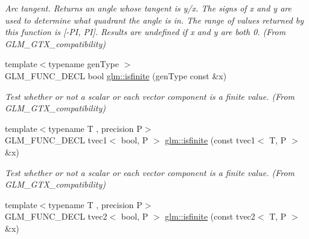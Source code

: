 \begin{DoxyCompactItemize}
\begin{DoxyCompactList}\small\item\em Arc tangent. Returns an angle whose tangent is y/x. The signs of x and y are used to determine what quadrant the angle is in. The range of values returned by this function is \mbox{[}-\/\-P\-I, P\-I\mbox{]}. Results are undefined if x and y are both 0. (From G\-L\-M\-\_\-\-G\-T\-X\-\_\-compatibility) \end{DoxyCompactList}\item 
\hypertarget{group__gtx__compatibility_gaf4b04dcd3526996d68c1bfe17bfc8657}{{\footnotesize template$<$typename gen\-Type $>$ }\\G\-L\-M\-\_\-\-F\-U\-N\-C\-\_\-\-D\-E\-C\-L bool \hyperlink{group__gtx__compatibility_gaf4b04dcd3526996d68c1bfe17bfc8657}{glm\-::isfinite} (gen\-Type const \&x)}\label{group__gtx__compatibility_gaf4b04dcd3526996d68c1bfe17bfc8657}

\begin{DoxyCompactList}\small\item\em Test whether or not a scalar or each vector component is a finite value. (From G\-L\-M\-\_\-\-G\-T\-X\-\_\-compatibility) \end{DoxyCompactList}\item 
\hypertarget{group__gtx__compatibility_ga553e2e95b06a0f70c718605998889d3b}{{\footnotesize template$<$typename T , precision P$>$ }\\G\-L\-M\-\_\-\-F\-U\-N\-C\-\_\-\-D\-E\-C\-L tvec1$<$ bool, P $>$ \hyperlink{group__gtx__compatibility_ga553e2e95b06a0f70c718605998889d3b}{glm\-::isfinite} (const tvec1$<$ T, P $>$ \&x)}\label{group__gtx__compatibility_ga553e2e95b06a0f70c718605998889d3b}

\begin{DoxyCompactList}\small\item\em Test whether or not a scalar or each vector component is a finite value. (From G\-L\-M\-\_\-\-G\-T\-X\-\_\-compatibility) \end{DoxyCompactList}\item 
\hypertarget{group__gtx__compatibility_ga7dd492aa7d6ec21715f9a91b6e5e596a}{{\footnotesize template$<$typename T , precision P$>$ }\\G\-L\-M\-\_\-\-F\-U\-N\-C\-\_\-\-D\-E\-C\-L tvec2$<$ bool, P $>$ \hyperlink{group__gtx__compatibility_ga7dd492aa7d6ec21715f9a91b6e5e596a}{glm\-::isfinite} (const tvec2$<$ T, P $>$ \&x)}\label{group__gtx__compatibility_ga7dd492aa7d6ec21715f9a91b6e5e596a}


\end{DoxyCompactItemize}
